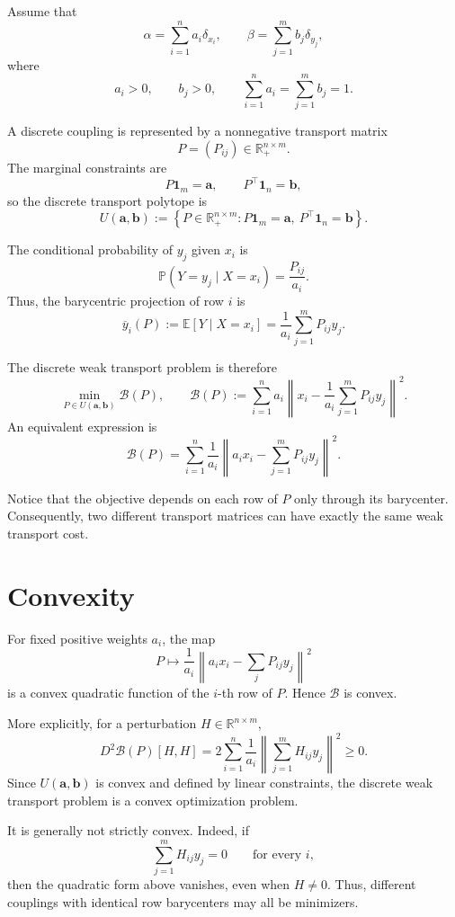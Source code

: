 \documentclass[11pt]{article}
\newcommand{\R}{\mathbb{R}}
\begin{document}
Assume that
\[
    \alpha=\sum_{i=1}^n a_i\delta_{x_i},
    \qquad
    \beta=\sum_{j=1}^m b_j\delta_{y_j},
\]
where
\[
    a_i>0,\qquad b_j>0,\qquad
    \sum_{i=1}^n a_i=\sum_{j=1}^m b_j=1.
\]

A discrete coupling is represented by a nonnegative transport matrix
\[
    P=(P_{ij})\in\R_+^{n\times m}.
\]
The marginal constraints are
\[
    P\bm{1}_m=\bm{a},
    \qquad
    P^\top\bm{1}_n=\bm{b},
\]
so the discrete transport polytope is
\[
    U(\bm{a},\bm{b})
    :=
    \left\{
        P\in\R_+^{n\times m}:
        P\bm{1}_m=\bm{a},\
        P^\top\bm{1}_n=\bm{b}
    \right\}.
\]

The conditional probability of $y_j$ given $x_i$ is
\[
    \mathbb{P}(Y=y_j\mid X=x_i)
    =
    \frac{P_{ij}}{a_i}.
\]
Thus, the barycentric projection of row $i$ is
\[
    \overline{y}_i(P)
    :=
    \mathbb{E}[Y\mid X=x_i]
    =
    \frac{1}{a_i}\sum_{j=1}^m P_{ij}y_j.
\]

The discrete weak transport problem is therefore
\[
    \boxed{
    \min_{P\in U(\bm{a},\bm{b})}
    \mathcal{B}(P),
    \qquad
    \mathcal{B}(P)
    :=
    \sum_{i=1}^n
    a_i
    \left\|
        x_i-\frac{1}{a_i}\sum_{j=1}^m P_{ij}y_j
    \right\|^2.
    }
\]
An equivalent expression is
\[
    \mathcal{B}(P)
    =
    \sum_{i=1}^n
    \frac{1}{a_i}
    \left\|
        a_i x_i-\sum_{j=1}^m P_{ij}y_j
    \right\|^2.
\]

Notice that the objective depends on each row of $P$ only through its
barycenter. Consequently, two different transport matrices can have exactly
the same weak transport cost.

\section{Convexity}

For fixed positive weights $a_i$, the map
\[
    P
    \longmapsto
    \frac{1}{a_i}
    \left\|
        a_i x_i-\sum_j P_{ij}y_j
    \right\|^2
\]
is a convex quadratic function of the $i$-th row of $P$. Hence
$\mathcal{B}$ is convex.

More explicitly, for a perturbation $H\in\R^{n\times m}$,
\[
    D^2\mathcal{B}(P)[H,H]
    =
    2\sum_{i=1}^n
    \frac{1}{a_i}
    \left\|
        \sum_{j=1}^m H_{ij}y_j
    \right\|^2
    \geq 0.
\]
Since $U(\bm{a},\bm{b})$ is convex and defined by linear constraints, the
discrete weak transport problem is a convex optimization problem.

It is generally not strictly convex. Indeed, if
\[
    \sum_{j=1}^m H_{ij}y_j=0
    \qquad\text{for every }i,
\]
then the quadratic form above vanishes, even when $H\neq 0$. Thus, different
couplings with identical row barycenters may all be minimizers.
\end{document}
